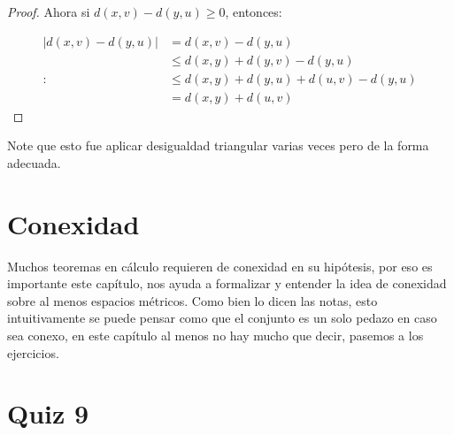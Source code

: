 \begin{itemize}[label={☠},leftmargin=*]
\begin{proof}
Ahora si $d(x,v)-d(y,u)\geq0$, entonces:

\begin{align*}
|d(x,v)-d(y,u)|&=d(x,v)-d(y,u)\\
&\leq d(x,y)+d(y,v)-d(y,u)\\ :
&\leq d(x,y)+d(y,u)+d(u,v)-d(y,u)\\
&=d(x,y)+d(u,v)
\end{align*}
\end{proof}

\begin{note}
Note que esto fue aplicar desigualdad triangular varias veces pero de la forma adecuada.
\end{note}

\end{itemize}

\section{Conexidad}

\begin{note}
Muchos teoremas en cálculo requieren de conexidad en su hipótesis, por eso es importante este capítulo, nos ayuda a formalizar y entender la idea de conexidad sobre al menos espacios métricos. Como bien lo dicen las notas, esto intuitivamente se puede pensar como que el conjunto es un solo pedazo en caso sea conexo, en este capítulo al menos no hay mucho que decir, pasemos a los ejercicios.
\end{note}

\section{Quiz 9}

